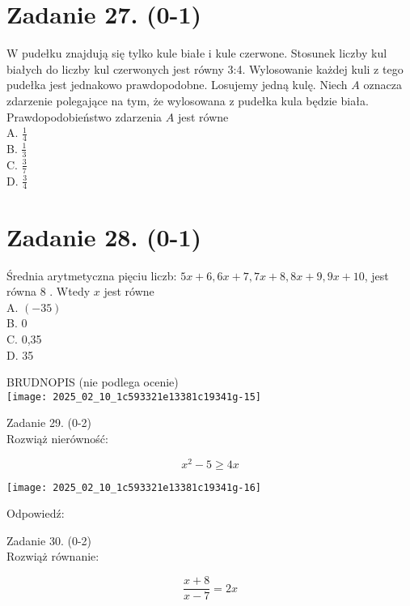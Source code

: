 \documentclass[10pt]{article}
\begin{document}
\section*{Zadanie 27. (0-1)}
W pudełku znajdują się tylko kule białe i kule czerwone. Stosunek liczby kul białych do liczby kul czerwonych jest równy 3:4. Wylosowanie każdej kuli z tego pudełka jest jednakowo prawdopodobne. Losujemy jedną kulę. Niech \(A\) oznacza zdarzenie polegające na tym, że wylosowana z pudełka kula będzie biała. Prawdopodobieństwo zdarzenia \(A\) jest równe\\
A. \(\frac{1}{4}\)\\
B. \(\frac{1}{3}\)\\
C. \(\frac{3}{7}\)\\
D. \(\frac{3}{4}\)

\section*{Zadanie 28. (0-1)}
Średnia arytmetyczna pięciu liczb: \(5 x+6,6 x+7,7 x+8,8 x+9,9 x+10\), jest równa 8 . Wtedy \(x\) jest równe\\
A. \((-35)\)\\
B. 0\\
C. 0,35\\
D. 35

BRUDNOPIS (nie podlega ocenie)\\
\texttt{[image: 2025\_02\_10\_1c593321e13381c19341g-15]}

Zadanie 29. (0-2)\\
Rozwiąż nierówność:

\[
x^{2}-5 \geq 4 x
\]

\begin{center}
\texttt{[image: 2025\_02\_10\_1c593321e13381c19341g-16]}
\end{center}

Odpowiedź:

Zadanie 30. (0-2)\\
Rozwiąż równanie:

\[
\frac{x+8}{x-7}=2 x
\]
\end{document}
